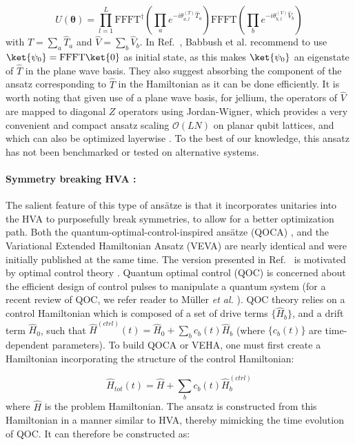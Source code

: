 \begin{equation}
    U(\boldsymbol{\theta}) = \prod_{l=1}^L \mathrm{FFFT}^{\dagger}\left( \prod_a e^{-i \theta_{a, l}^{(T)} \hat{T}_a} \right) \mathrm{FFFT} \left( \prod_b e^{-i \theta_{b, l}^{(V)} \hat{V}_b} \right) 
\end{equation}
with $\hat{T} = \sum_a \hat{T}_a$ and $\hat{V} = \sum_b \hat{V}_b$. In Ref.~\cite{Babbush2018}, Babbush et al. recommend to use $\ket{\psi_0} = \mathrm{FFFT} \ket{0}$ as initial state, as this makes $\ket{\psi_0}$ an eigenstate of $\hat{T}$ in the plane wave basis. They also suggest absorbing the component of the ansatz corresponding to $\hat{T}$ in the Hamiltonian as it can be done efficiently. It is worth noting that given use of a plane wave basis, for jellium, the operators of $\hat{V}$ are mapped to diagonal $Z$ operators using Jordan-Wigner, which provides a very convenient and compact ansatz scaling $\mathcal{O}(LN)$ on planar qubit lattices, and which can also be optimized layerwise \cite{Wecker2015, Babbush2018}. To the best of our knowledge, this ansatz has not been benchmarked or tested on alternative systems.

\paragraph{Symmetry breaking HVA \cite{Vogt2020, Choquette2021}:} The salient feature of this type of ans{\"{a}}tze is that it incorporates unitaries into the HVA to purposefully break symmetries, to allow for a better optimization path. Both the quantum-optimal-control-inspired ans{\"{a}}tze (QOCA) \cite{Choquette2021}, and the Variational Extended Hamiltonian Ansatz (VEVA) \cite{Vogt2020} are nearly identical and were initially published at the same time. 
The version presented in Ref.~\cite{Choquette2021} is motivated by optimal control theory \cite{Werschnik2007, Alessandro2007}. Quantum optimal control (QOC) is concerned about the efficient design of control pulses to manipulate a quantum system (for a recent review of QOC, we refer reader to M{\"{u}}ller \textit{et al.} \cite{Muller2021}). QOC theory relies on a control Hamiltonian which is composed of a set of drive terms $\{\hat{H}_b\}$, and a drift term $\hat{H}_0$, such that $\hat{H}^{(ctrl)}(t) = \hat{H}_0 + \sum_b c_b(t) \hat{H}_b$ (where $\{c_b(t)\}$ are time-dependent parameters). To build QOCA or VEHA, one must first create a Hamiltonian incorporating the structure of the control Hamiltonian:

\begin{equation}
    \hat{H}_{tot}(t) = \hat{H} + \sum_b c_b(t) \hat{H}_b^{(ctrl)}
\end{equation}
where $\hat{H}$ is the problem Hamiltonian. The ansatz is constructed from this Hamiltonian in a manner similar to HVA, thereby mimicking the time evolution of QOC. It can therefore be constructed as:

